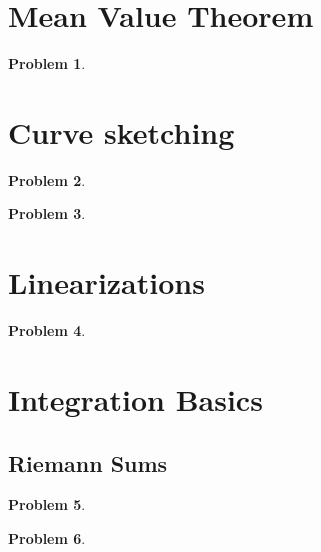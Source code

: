 \documentclass{article}
\newtheorem{problem}{Problem}
\begin{document}
\section{Mean Value Theorem}
\begin{problem}

\end{problem}


\section{Curve sketching}
\begin{problem}

\end{problem}


\begin{problem}

\end{problem}

\section{Linearizations}
\begin{problem}

\end{problem}



\section{Integration Basics}
\subsection{Riemann Sums}
\begin{problem}

\end{problem}


\begin{problem}

\end{problem}

\end{document}
